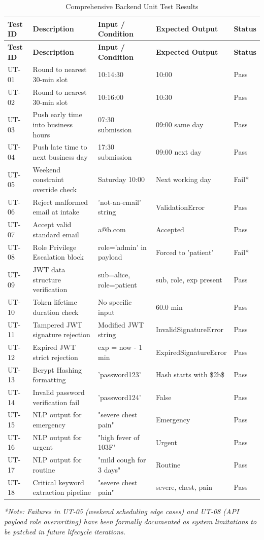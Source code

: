 \documentclass[12pt,a4paper]{report}
\begin{document}
\begin{longtable}{|p{1.5cm}|p{4.5cm}|p{3.5cm}|p{3.5cm}|p{1.5cm}|}
\caption{Comprehensive Backend Unit Test Results} \\
\hline
\textbf{Test ID} & \textbf{Description} & \textbf{Input / Condition} & \textbf{Expected Output} & \textbf{Status} \\ \hline
\endfirsthead
\hline
\textbf{Test ID} & \textbf{Description} & \textbf{Input / Condition} & \textbf{Expected Output} & \textbf{Status} \\ \hline
\endhead
UT-01 & Round to nearest 30-min slot & 10:14:30 & 10:00 & Pass \\ \hline
UT-02 & Round to nearest 30-min slot & 10:16:00 & 10:30 & Pass \\ \hline
UT-03 & Push early time into business hours & 07:30 submission & 09:00 same day & Pass \\ \hline
UT-04 & Push late time to next business day & 17:30 submission & 09:00 next day & Pass \\ \hline
UT-05 & Weekend constraint override check & Saturday 10:00 & Next working day & Fail* \\ \hline
UT-06 & Reject malformed email at intake & 'not-an-email' string & ValidationError & Pass \\ \hline
UT-07 & Accept valid standard email & a@b.com & Accepted & Pass \\ \hline
UT-08 & Role Privilege Escalation block & role='admin' in payload & Forced to 'patient' & Fail* \\ \hline
UT-09 & JWT data structure verification & sub=alice, role=patient & sub, role, exp present & Pass \\ \hline
UT-10 & Token lifetime duration check & No specific input & 60.0 min & Pass \\ \hline
UT-11 & Tampered JWT signature rejection & Modified JWT string & InvalidSignatureError & Pass \\ \hline
UT-12 & Expired JWT strict rejection & exp = now - 1 min & ExpiredSignatureError & Pass \\ \hline
UT-13 & Bcrypt Hashing formatting & 'password123' & Hash starts with \$2b\$ & Pass \\ \hline
UT-14 & Invalid password verification fail & 'password124' & False & Pass \\ \hline
UT-15 & NLP output for emergency & "severe chest pain" & Emergency & Pass \\ \hline
UT-16 & NLP output for urgent & "high fever of 103F" & Urgent & Pass \\ \hline
UT-17 & NLP output for routine & "mild cough for 3 days" & Routine & Pass \\ \hline
UT-18 & Critical keyword extraction pipeline & "severe chest pain" & severe, chest, pain & Pass \\ \hline
\end{longtable}
\textit{*Note: Failures in UT-05 (weekend scheduling edge cases) and UT-08 (API payload role overwriting) have been formally documented as system limitations to be patched in future lifecycle iterations.}
\end{document}
